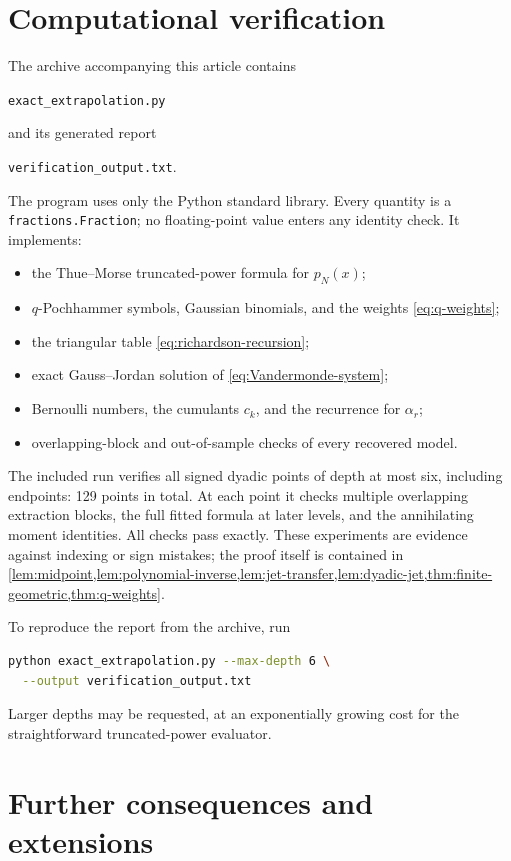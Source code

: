 \documentclass[11pt]{article}
\theoremstyle{definition}
\theoremstyle{remark}
\begin{document}
\section{Computational verification}

The archive accompanying this article contains
\begin{center}
 \texttt{exact\_extrapolation.py}
\end{center}
and its generated report
\begin{center}
 \texttt{verification\_output.txt}.
\end{center}
The program uses only the Python standard library.  Every quantity is a
\texttt{fractions.Fraction}; no floating-point value enters any identity check.
It implements:
\begin{itemize}[leftmargin=2em]
 \item the Thue--Morse truncated-power formula for \(p_N(x)\);
 \item \(q\)-Pochhammer symbols, Gaussian binomials, and the weights
       \cref{eq:q-weights};
 \item the triangular table \cref{eq:richardson-recursion};
 \item exact Gauss--Jordan solution of \cref{eq:Vandermonde-system};
 \item Bernoulli numbers, the cumulants \(c_k\), and the recurrence for
       \(\alpha_r\);
 \item overlapping-block and out-of-sample checks of every recovered model.
\end{itemize}

The included run verifies all signed dyadic points of depth at most six,
including endpoints: 129 points in total.  At each point it checks multiple
overlapping extraction blocks, the full fitted formula at later levels, and
the annihilating moment identities.  All checks pass exactly.  These
experiments are evidence against indexing or sign mistakes; the proof itself
is contained in \cref{lem:midpoint,lem:polynomial-inverse,lem:jet-transfer,lem:dyadic-jet,thm:finite-geometric,thm:q-weights}.

To reproduce the report from the archive, run
\begin{lstlisting}[style=code,language=bash]
python exact_extrapolation.py --max-depth 6 \
  --output verification_output.txt
\end{lstlisting}
Larger depths may be requested, at an exponentially growing cost for the
straightforward truncated-power evaluator.

\section{Further consequences and extensions}
\end{document}
